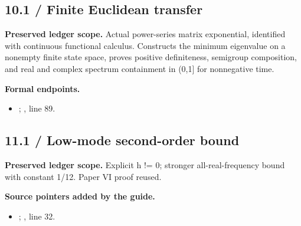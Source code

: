 \subsection{10.1 / Finite Euclidean transfer}
\label{result:10.1}
\textbf{Preserved ledger scope.} Actual power-series matrix exponential, identified with continuous functional calculus. Constructs the minimum eigenvalue on a nonempty finite state space, proves positive definiteness, semigroup composition, and real and complex spectrum containment in (0,1] for nonnegative time.

\textbf{Formal endpoints.}\begin{itemize}
\item {}; , line 89.
\end{itemize}
\subsection{11.1 / Low-mode second-order bound}
\label{result:11.1}
\textbf{Preserved ledger scope.} Explicit h != 0; stronger all-real-frequency bound with constant 1/12. Paper VI proof reused.

\textbf{Source pointers added by the guide.}\begin{itemize}
\item {}; , line 32.
\end{itemize}
